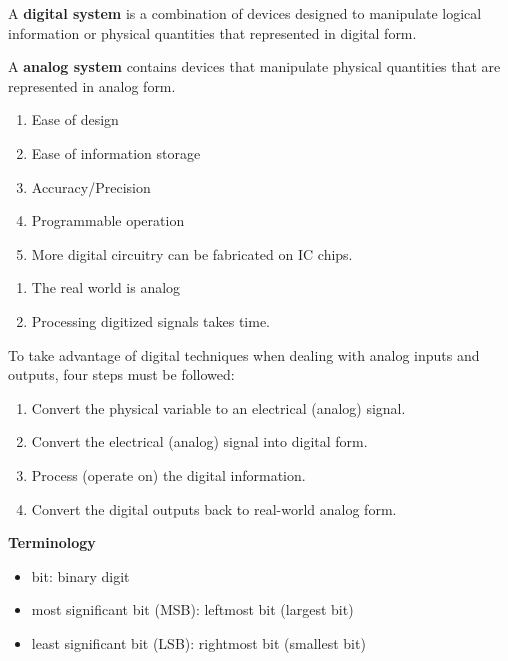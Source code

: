         \par A \textbf{digital system} is a combination of devices designed to manipulate logical
        information or physical quantities that represented in digital form.
        \par A \textbf{analog system} contains devices that manipulate physical quantities that
        are represented in analog form.
        \begin{enumerate}
            \item Ease of design
            \item Ease of information storage
            \item Accuracy/Precision
            \item Programmable operation
            \item More digital circuitry can be fabricated \footnotemark on IC chips.
        \end{enumerate}
        \begin{enumerate}
            \item The real world is analog
            \item Processing digitized signals takes time.
        \end{enumerate}
        \par To take advantage of digital techniques when dealing with analog inputs and outputs,
        four steps must be followed:
        \begin{enumerate}
            \item Convert the physical variable to an electrical (analog) signal.
            \item Convert the electrical (analog) signal into digital form.
            \item Process (operate on) the digital information.
            \item Convert the digital outputs back to real-world analog form.
        \end{enumerate}
    
    \par \textbf{Terminology}
    \begin{itemize}
        \item bit: binary digit
        \item most significant bit (MSB): leftmost bit (largest bit)
        \item least significant bit (LSB): rightmost bit (smallest bit)
    \end{itemize}

